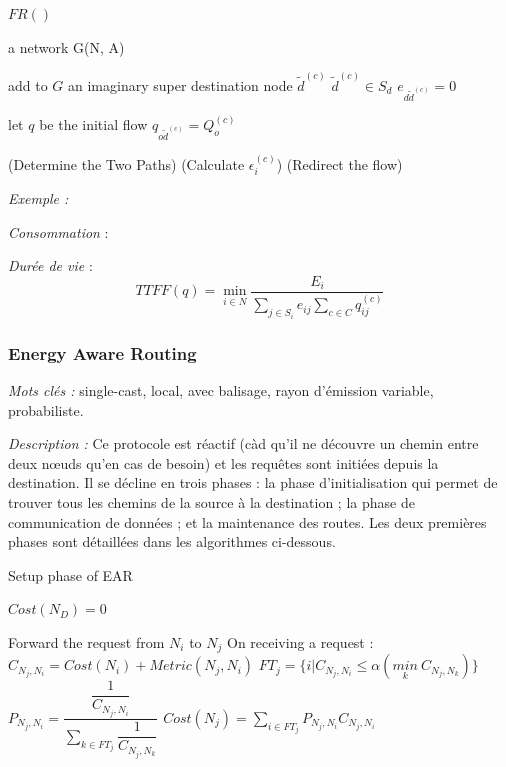 \begin{algorithm}[H]
\caption{$FR()$}
\label{algo_FR}
\begin{algorithmic}
\REQUIRE a network G(N, A)

add to $G$ an imaginary super destination node $\tilde{d}^{(c)}$
	\STATE $\tilde{d}^{(c)} \in S_d$
	\STATE $e_{d \tilde{d}^{(c)}} = 0$
\ENDFOR

let $q$ be the initial flow
	\STATE $q_{o \tilde{d}^{(c)}} = Q_o^{(c)}$
\ENDFOR

		\STATE (Determine the Two Paths)
		\STATE (Calculate $\epsilon_i^{(c)}$)
		\STATE (Redirect the flow)
	\ENDFOR
\ENDFOR

\RETURN 
\end{algorithmic}
\end{algorithm}


\emph{Exemple :} %

\emph{Consommation} : 

\emph{Durée de vie} :  $$TTFF(q) = \min\limits_{i \in N}\frac{E_i}{\sum \limits_{j \in S_i} {e_{ij}} \sum \limits_{c \in C} {q_{ij}^{(c)}}}$$



\subsubsection{Energy Aware Routing \cite{Shah2002}}
\emph{Mots clés :} single-cast, local, avec balisage, rayon d'émission variable, probabiliste.

\emph{Description :}
Ce protocole est réactif (càd qu'il ne découvre un chemin entre deux nœuds qu’en cas de besoin) et les requêtes sont initiées depuis la destination. Il se décline en trois phases : la phase d'initialisation qui permet de trouver tous les chemins de la source à la destination ; la phase de communication de données ; et la maintenance des routes. Les deux premières phases sont détaillées dans les algorithmes ci-dessous.

\begin{algorithm}[H]
\caption{Setup phase of EAR}
\label{algo_EAR_sp}
\begin{algorithmic}

\STATE $Cost(N_D) = 0$

			\STATE Forward the request from $N_i$ to $N_j$
		\ENDIF
	\ENDFOR
\ENDFOR
\STATE
{}
		\STATE On receiving a request :
		\STATE $C_{N_j,N_i} = Cost(N_i)+Metric(N_j,N_i)$
		\STATE $FT_j = \{i | C_{N_j,N_i} \leq \alpha (\underset{k}{min}\ C_{N_j,N_k})\}$
		\STATE
		\STATE $P_{N_j,N_i} = \dfrac{\dfrac{1}{C_{N_j,N_i}}}{\sum \limits_{k \in FT_j} \dfrac{1}{C_{N_j,N_k}}}$
		\STATE
		\STATE $Cost(N_j) = \sum \limits_{i \in FT_j} {P_{N_j,N_i} C_{N_j,N_i}}$
	\ENDFOR
\ENDFOR
\end{algorithmic}
\end{algorithm}


